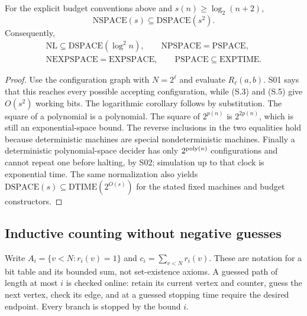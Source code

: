 \begin{corollary}
\label{thm:S06}
For the explicit budget conventions above and $s(n)\geq\log_2(n+2)$,
\[
 \mathrm{NSPACE}(s)\subseteq\mathrm{DSPACE}(s^2).
\]
Consequently,
\[
 \begin{gathered}
 \mathrm{NL}\subseteq\mathrm{DSPACE}(\log^2 n),\qquad
 \mathrm{NPSPACE}=\mathrm{PSPACE},\\
 \mathrm{NEXPSPACE}=\mathrm{EXPSPACE},\qquad
 \mathrm{PSPACE}\subseteq\mathrm{EXPTIME}.
 \end{gathered}
\]
\end{corollary}
\begin{proof}
Use the configuration graph with $N=2^\ell$ and evaluate
$R_\ell(a,b)$.  S01 says that this reaches every possible accepting
configuration, while (S.3) and (S.5) give $O(s^2)$ working bits.
The logarithmic corollary follows by substitution.  The square of a
polynomial is a polynomial.  The square of $2^{p(n)}$ is $2^{2p(n)}$,
which is still an exponential-space bound.  The reverse inclusions in
the two equalities hold because deterministic machines are special
nondeterministic machines.  Finally a deterministic polynomial-space
decider has only $2^{\operatorname{poly}(n)}$ configurations and cannot repeat one
before halting, by S02; simulation up to that clock is exponential time.
The same normalization also yields
$\mathrm{DSPACE}(s)\subseteq\mathrm{DTIME}(2^{O(s)})$ for the stated
fixed machines and budget constructors.
\end{proof}

\subsection{Inductive counting without negative guesses}

Write $A_i=\{v<N:r_i(v)=1\}$ and $c_i=\sum_{v<N}r_i(v)$.  These are
notation for a bit table and its bounded sum, not set-existence axioms.
A guessed path of length at most $i$ is checked online: retain its
current vertex and counter, guess the next vertex, check its edge, and
at a guessed stopping time require the desired endpoint.  Every branch
is stopped by the bound $i$.

